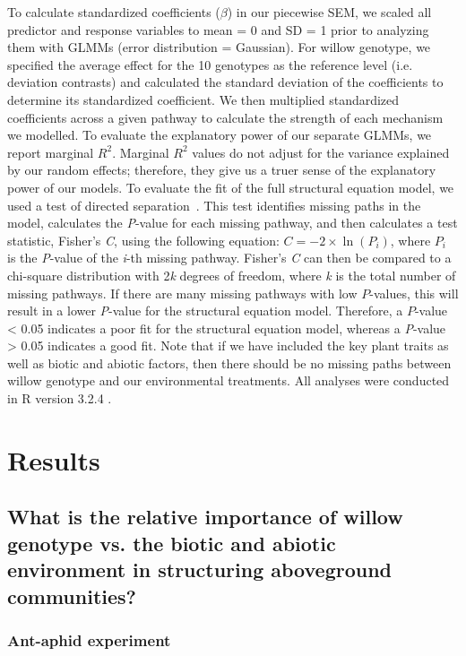\documentclass[11pt]{article}
\begin{document}
To calculate standardized coefficients ($\beta$) in our piecewise SEM, we scaled
all predictor and response variables to mean = 0 and SD = 1 prior to
analyzing them with GLMMs (error distribution = Gaussian). For willow
genotype, we specified the average effect for the 10 genotypes as the
reference level (i.e. deviation contrasts) and calculated the standard
deviation of the coefficients to determine its standardized coefficient.
We then multiplied standardized coefficients across a given pathway to
calculate the strength of each mechanism we modelled. To evaluate the
explanatory power of our separate GLMMs, we report marginal
\(R^2\)\cite{Nakagawa_2012}. Marginal \(R^2\) values do
not adjust for the variance explained by our random effects; therefore,
they give us a truer sense of the explanatory power of our models. To
evaluate the fit of the full structural equation model, we used a test
of directed separation~\cite{shipley2000new}. This test identifies missing
paths in the model, calculates the \emph{P}-value for each missing
pathway, and then calculates a test statistic, Fisher's \emph{C}, using
the following equation: \(C=-2\times\ln\left(P_i\right)\), where \(P_i\) is the
\emph{P}-value of the \emph{i}-th missing pathway. Fisher's \emph{C} can
then be compared to a chi-square distribution with 2\emph{k} degrees of
freedom, where \emph{k} is the total number of missing pathways. If
there are many missing pathways with low $P$-values, this will result in a
lower \emph{P}-value for the structural equation model. Therefore, a
$P$-value \textless{} 0.05 indicates a poor fit for the structural
equation model, whereas a \emph{P}-value \textgreater{} 0.05 indicates a
good fit. Note that if we have included the key plant traits as well as
biotic and abiotic factors, then there should be no missing paths
between willow genotype and our environmental treatments. All analyses
were conducted in R version 3.2.4 \cite{R2016}.
 

\section*{Results}

\subsection*{What is the relative importance of willow genotype vs. the biotic and
abiotic environment in structuring aboveground communities?}

\subsubsection*{Ant-aphid experiment}
\end{document}
